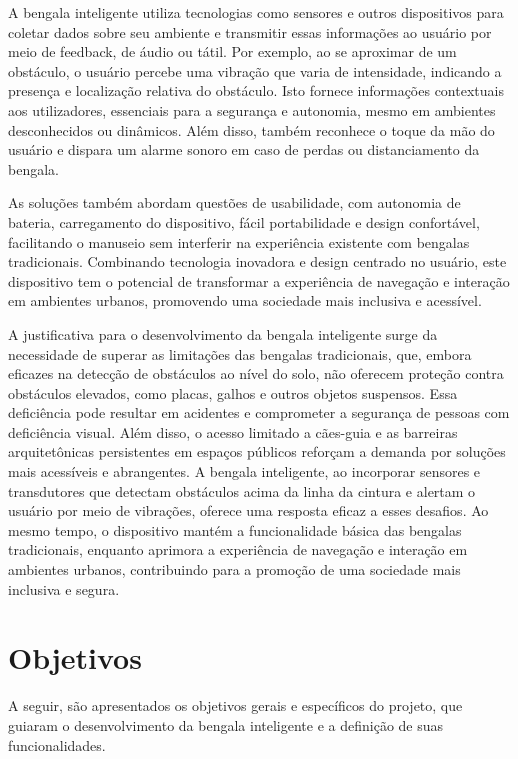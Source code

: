 A bengala inteligente utiliza tecnologias como sensores e outros dispositivos para coletar dados sobre seu ambiente e transmitir essas informações ao usuário por meio de feedback, de áudio ou tátil. Por exemplo, ao se aproximar de um obstáculo, o usuário percebe uma vibração que varia de intensidade, indicando a presença e localização relativa do obstáculo. Isto fornece informações contextuais aos utilizadores, essenciais para a segurança e autonomia, mesmo em ambientes desconhecidos ou dinâmicos. Além disso, também reconhece o toque da mão do usuário e dispara um alarme sonoro em caso de perdas ou distanciamento da bengala.

As soluções também abordam questões de usabilidade, com autonomia de bateria, carregamento do dispositivo, fácil portabilidade e design confortável, facilitando o manuseio sem interferir na experiência existente com bengalas tradicionais. Combinando tecnologia inovadora e design centrado no usuário, este dispositivo tem o potencial de transformar a experiência de navegação e interação em ambientes urbanos, promovendo uma sociedade mais inclusiva e acessível.


A justificativa para o desenvolvimento da bengala inteligente surge da necessidade de superar as limitações das bengalas tradicionais, que, embora eficazes na detecção de obstáculos ao nível do solo, não oferecem proteção contra obstáculos elevados, como placas, galhos e outros objetos suspensos. Essa deficiência pode resultar em acidentes e comprometer a segurança de pessoas com deficiência visual. Além disso, o acesso limitado a cães-guia e as barreiras arquitetônicas persistentes em espaços públicos reforçam a demanda por soluções mais acessíveis e abrangentes. A bengala inteligente, ao incorporar sensores e transdutores que detectam obstáculos acima da linha da cintura e alertam o usuário por meio de vibrações, oferece uma resposta eficaz a esses desafios. Ao mesmo tempo, o dispositivo mantém a funcionalidade básica das bengalas tradicionais, enquanto aprimora a experiência de navegação e interação em ambientes urbanos, contribuindo para a promoção de uma sociedade mais inclusiva e segura.

\section{Objetivos}


A seguir, são apresentados os objetivos gerais e específicos do projeto, que guiaram o desenvolvimento da bengala inteligente e a definição de suas funcionalidades.

